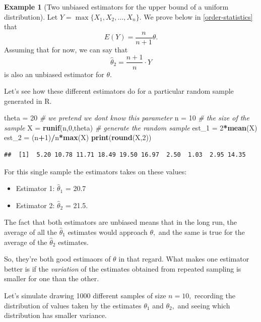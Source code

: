 \documentclass[
]{book}
\newenvironment{Shaded}{\begin{snugshade}}{\end{snugshade}}
\newcommand{\CommentTok}[1]{\textcolor[rgb]{0.56,0.35,0.01}{\textit{#1}}}
\newcommand{\DecValTok}[1]{\textcolor[rgb]{0.00,0.00,0.81}{#1}}
\newcommand{\FunctionTok}[1]{\textcolor[rgb]{0.13,0.29,0.53}{\textbf{#1}}}
\newcommand{\NormalTok}[1]{#1}
\newcommand{\OtherTok}[1]{\textcolor[rgb]{0.56,0.35,0.01}{#1}}
\newcommand{\SpecialCharTok}[1]{\textcolor[rgb]{0.81,0.36,0.00}{\textbf{#1}}}
\providecommand{\tightlist}{%
  \setlength{\itemsep}{0pt}\setlength{\parskip}{0pt}}
\theoremstyle{definition}
\theoremstyle{definition}
\newtheorem{example}{Example}[chapter]
\theoremstyle{definition}
\theoremstyle{definition}
\theoremstyle{remark}
\begin{document}
\begin{example}[Two unbiased estimators for the upper bound of a uniform distribution]
Let \(Y = \max\{X_1, X_2, \ldots, X_n\}.\) We prove below in \ref{order-statistics} that \[E(Y) = \frac{n}{n+1}\theta.\]
Assuming that for now, we can say that \[\hat{\theta}_2 = \frac{n+1}{n}\cdot Y \tag{unbiased estimator 2}\] is also an unbiased estimator for \(\theta\).

Let's see how these different estimators do for a particular random sample generated in R.

\begin{Shaded}
\begin{Highlighting}[]
\NormalTok{theta }\OtherTok{=} \DecValTok{20} \CommentTok{\# we pretend we don\textquotesingle{}t know this parameter}
\NormalTok{n }\OtherTok{=} \DecValTok{10} \CommentTok{\# the size of the sample}
\NormalTok{X }\OtherTok{=} \FunctionTok{runif}\NormalTok{(n,}\DecValTok{0}\NormalTok{,theta) }\CommentTok{\# generate the random sample}
\NormalTok{est\_1 }\OtherTok{=} \DecValTok{2}\SpecialCharTok{*}\FunctionTok{mean}\NormalTok{(X)}
\NormalTok{est\_2 }\OtherTok{=}\NormalTok{ (n}\SpecialCharTok{+}\DecValTok{1}\NormalTok{)}\SpecialCharTok{/}\NormalTok{n}\SpecialCharTok{*}\FunctionTok{max}\NormalTok{(X)}
\FunctionTok{print}\NormalTok{(}\FunctionTok{round}\NormalTok{(X,}\DecValTok{2}\NormalTok{))}
\end{Highlighting}
\end{Shaded}

\begin{verbatim}
##  [1]  5.20 10.78 11.71 18.49 19.50 16.97  2.50  1.03  2.95 14.35
\end{verbatim}

For this single sample the estimators takes on these values:

\begin{itemize}
\tightlist
\item
  Estimator 1: \(\hat{\theta}_1\) = 20.7
\item
  Estimator 2: \(\hat{\theta}_2\) = 21.5.
\end{itemize}

The fact that both estimators are unbiased means that in the long run, the average of all the \(\hat{\theta}_1\) estimates would approach \(\theta,\) and the same is true for the average of the \(\hat{\theta}_2\) estimates.

So, they're both good estimaors of \(\theta\) in that regard. What makes one estimator better is if the \emph{variation} of the estimates obtained from repeated sampling is smaller for one than the other.

Let's simulate drawing 1000 different samples of size \(n = 10,\) recording the distribution of values taken by the estimates \(\theta_1\) and \(\theta_2,\) and seeing which distribution has smaller variance.


\end{example}
\end{document}
